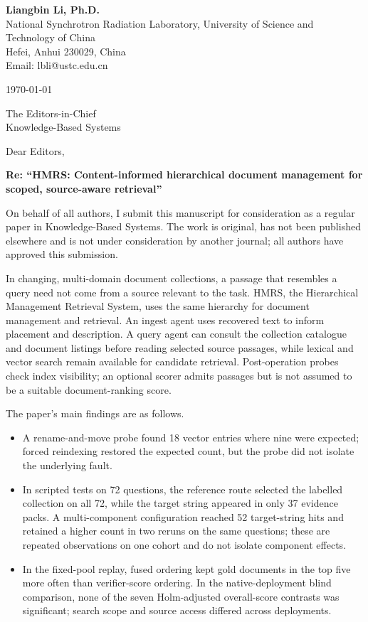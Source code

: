 \documentclass[11pt,a4paper]{article}
\begin{document}
\textbf{Liangbin Li, Ph.D.}\\
{}National Synchrotron Radiation Laboratory, University of Science and Technology of China\\
{}Hefei, Anhui 230029, China\\
Email: lbli@ustc.edu.cn

\today

The Editors-in-Chief\\
Knowledge-Based Systems

Dear Editors,

\textbf{Re: ``HMRS: Content-informed hierarchical document management for scoped, source-aware retrieval''}

On behalf of all authors, I submit this manuscript for consideration as a
regular paper in Knowledge-Based Systems. The work is original, has not
been published elsewhere and is not under consideration by another
journal; all authors have approved this submission.

In changing, multi-domain document collections, a passage that resembles a
query need not come from a source relevant to the task. HMRS, the Hierarchical
Management Retrieval System, uses the same hierarchy for document management
and retrieval. An ingest agent uses recovered text to inform placement and
description. A query agent can consult the collection catalogue and document
listings before reading selected source passages, while lexical and vector
search remain available for candidate retrieval. Post-operation probes check
index visibility; an optional scorer admits passages but is not assumed to be
a suitable document-ranking score.

The paper's main findings are as follows.
\begin{itemize}[leftmargin=1.5em,itemsep=1pt,topsep=2pt,parsep=0pt]
\item A rename-and-move probe found 18 vector entries where nine were
expected; forced reindexing restored the expected count, but the probe did
not isolate the underlying fault.
\item In scripted tests on 72 questions, the reference route selected the
labelled collection on all 72, while the target string appeared in only 37
evidence packs. A multi-component configuration reached 52 target-string
hits and retained a higher count in two reruns on the same questions; these
are repeated observations on one cohort and do not isolate component effects.
\item In the fixed-pool replay, fused ordering kept gold documents in the top
five more often than verifier-score ordering. In the native-deployment blind
comparison, none of the seven Holm-adjusted overall-score contrasts was
significant; search scope and source access differed across deployments.
\end{itemize}
\end{document}
